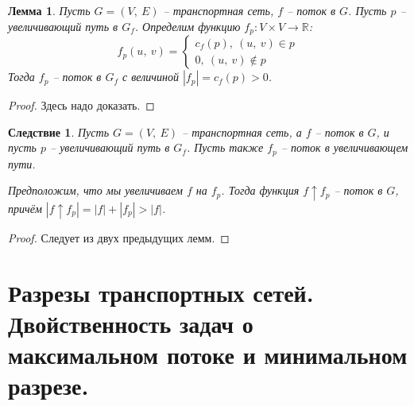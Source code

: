\documentclass[a4paper,12pt]{article}
\newtheorem*{fulllemma}{Лемма}
\newtheorem*{consequence}{Следствие}
\newcommand{\R}{\mathbb{R}}
\begin{document}
\begin{fulllemma}
Пусть $G = (V,\ E)$ -- транспортная сеть, $f$ -- поток в $G$. Пусть $p$ -- увеличивающий путь в $G_f$. Определим функцию $f_p : V \times V \to \R$: \[f_p(u,\ v) = \begin{cases}c_f(p),\ (u,\ v) \in p\\ 0,\ (u,\ v) \notin p\end{cases}\]
Тогда $f_p$ -- поток в $G_f$ с величиной $|f_p| = c_f(p) > 0$.
\end{fulllemma}
\begin{proof}
 Здесь надо доказать.
\end{proof}
\begin{consequence}
 Пусть $G = (V,\ E)$ -- транспортная сеть, а $f$ -- поток в $G$, и пусть $p$ -- увеличивающий путь в $G_f$. Пусть также $f_p$ -- поток в увеличивающем пути.
 
 Предположим, что мы увеличиваем $f$ на $f_p$. Тогда функция $f\uparrow f_p$ -- поток в $G$, причём $|f\uparrow f_p| = |f| + |f_p| > |f|$.
\end{consequence}
\begin{proof}
    Следует из двух предыдущих лемм.
\end{proof}
\newpage
\section{Разрезы транспортных сетей. Двойственность задач о максимальном потоке и минимальном разрезе.}
\end{document}
